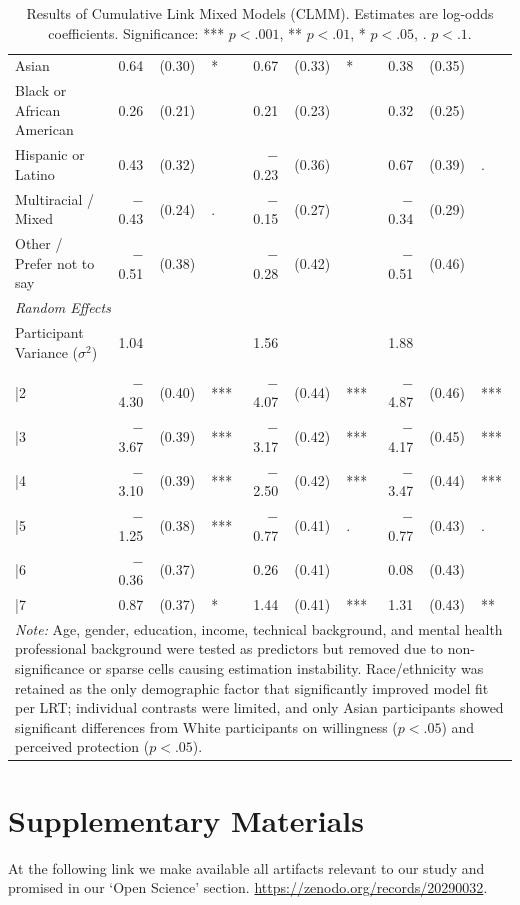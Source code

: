 \documentclass[letterpaper,twocolumn,10pt]{article}
\begin{document}
\begin{table}[htbp]
\begin{tabular}{l rcl rcl rcl}
\quad Asian & 0.64 & (0.30) & * & 0.67 & (0.33) & * & 0.38 & (0.35) & \\
\quad Black or African American & 0.26 & (0.21) & & 0.21 & (0.23) & & 0.32 & (0.25) & \\
\quad Hispanic or Latino & 0.43 & (0.32) & & $-$0.23 & (0.36) & & 0.67 & (0.39) & . \\
\quad Multiracial / Mixed & $-$0.43 & (0.24) & . & $-$0.15 & (0.27) & & $-$0.34 & (0.29) & \\
\quad Other / Prefer not to say & $-$0.51 & (0.38) & & $-$0.28 & (0.42) & & $-$0.51 & (0.46) & \\
\midrule
\multicolumn{10}{l}{\textit{Random Effects}} \\
\quad Participant Variance ($\sigma^2$) & 1.04 & & & 1.56 & & & 1.88 & & \\
\addlinespace
\multicolumn{10}{l}{\textit{Thresholds (Intercepts)}} \\
\quad 1|2 & $-$4.30 & (0.40) & *** & $-$4.07 & (0.44) & *** & $-$4.87 & (0.46) & *** \\
\quad 2|3 & $-$3.67 & (0.39) & *** & $-$3.17 & (0.42) & *** & $-$4.17 & (0.45) & *** \\
\quad 3|4 & $-$3.10 & (0.39) & *** & $-$2.50 & (0.42) & *** & $-$3.47 & (0.44) & *** \\
\quad 4|5 & $-$1.25 & (0.38) & *** & $-$0.77 & (0.41) & . & $-$0.77 & (0.43) & . \\
\quad 5|6 & $-$0.36 & (0.37) & & 0.26 & (0.41) & & 0.08 & (0.43) & \\
\quad 6|7 & 0.87 & (0.37) & * & 1.44 & (0.41) & *** & 1.31 & (0.43) & ** \\
\bottomrule[1pt]
\multicolumn{10}{p{0.95\textwidth}}{\footnotesize \textit{Note:} Age, gender, education, income, technical background, and mental health professional background were tested as predictors but removed due to non-significance or sparse cells causing estimation instability. Race/ethnicity was retained as the only demographic factor that significantly improved model fit per LRT; individual contrasts were limited, and only Asian participants showed significant differences from White participants on willingness ($p < .05$) and perceived protection ($p < .05$).}
\end{tabular}
\caption{Results of Cumulative Link Mixed Models (CLMM). Estimates are log-odds coefficients. Significance: *** $p < .001$, ** $p < .01$, * $p < .05$, . $p < .1$.}
\label{tab:full-clmm}
\end{table}

\section{Supplementary Materials}
\label{sec:codebook}
\label{app:supplementary}

At the following link we make available all artifacts relevant to our study and promised in our `Open Science' section. \url{https://zenodo.org/records/20290032}.

\end{document}
